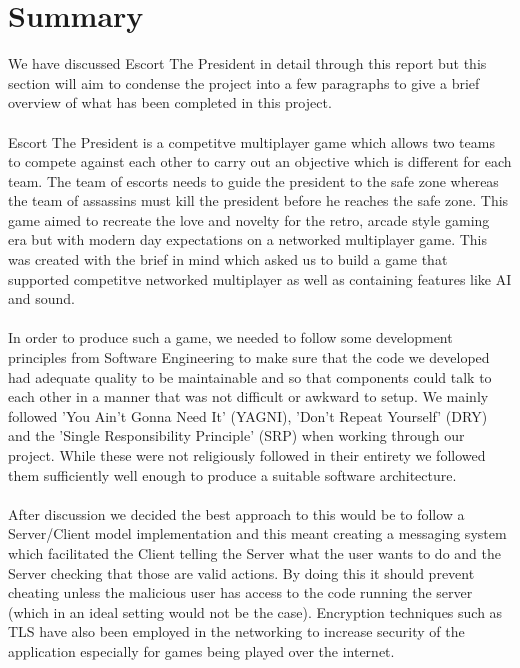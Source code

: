\documentclass[12pt]{article}
\newcommand{\return}{\\\\\noindent}
\begin{document}
\section{Summary}
We have discussed Escort The President in detail through this report but this section will aim to condense the project into a few paragraphs to give a brief overview of what has been completed in this project.\return
Escort The President is a competitve multiplayer game which allows two teams to compete against each other to carry out an objective which is different for each team. The team of escorts needs to guide the president to the safe zone whereas the team of assassins must kill the president before he reaches the safe zone. This game aimed to recreate the love and novelty for the retro, arcade style gaming era but with modern day expectations on a networked multiplayer game. This was created with the brief in mind which asked us to build a game that supported competitve networked multiplayer as well as containing features like AI and sound. \return
In order to produce such a game, we needed to follow some development principles from Software Engineering to make sure that the code we developed had adequate quality to be maintainable and so that components could talk to each other in a manner that was not difficult or awkward to setup. We mainly followed 'You Ain't Gonna Need It' (YAGNI), 'Don't Repeat Yourself' (DRY) and the 'Single Responsibility Principle' (SRP) when working through our project. While these were not religiously followed in their entirety we followed them sufficiently well enough to produce a suitable software architecture.\return
After discussion we decided the best approach to this would be to follow a Server/Client model implementation and this meant creating a messaging system which facilitated the Client telling the Server what the user wants to do and the Server checking that those are valid actions. By doing this it should prevent cheating unless the malicious user has access to the code running the server (which in an ideal setting would not be the case). Encryption techniques such as TLS have also been employed in the networking to increase security of the application especially for games being played over the internet.\return
\end{document}
